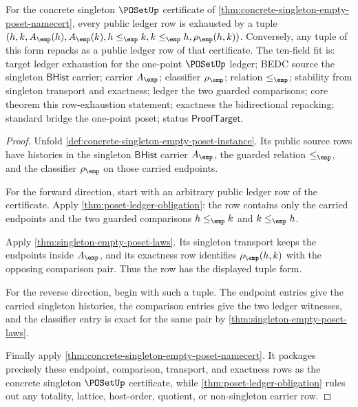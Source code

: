 \begin{theorem}
\label{thm:poset-prefix-ledger-row-exhaustion}
For the concrete singleton $\POSetUp$ certificate of
\autoref{thm:concrete-singleton-empty-poset-namecert}, every public ledger row
is exhausted by a tuple
$(h,k,A_{\emp}(h),A_{\emp}(k),h\le_{\emp}k,k\le_{\emp}h,\rho_{\emp}(h,k))$.
Conversely, any tuple of this form repacks as a public ledger row of that
certificate. The ten-field fit is: target ledger exhaustion for the one-point
$\POSetUp$ ledger; BEDC source the singleton $\mathsf{BHist}$ carrier; carrier
$A_{\emp}$; classifier $\rho_{\emp}$; relation $\le_{\emp}$; stability from
singleton transport and exactness; ledger the two guarded comparisons; core
theorem this row-exhaustion statement; exactness the bidirectional repacking;
standard bridge the one-point poset; status $\mathsf{ProofTarget}$.
\end{theorem}
\begin{proof}
Unfold \autoref{def:concrete-singleton-empty-poset-instance}. Its public
source rows have histories in the singleton $\mathsf{BHist}$ carrier
$A_{\emp}$, the guarded relation $\le_{\emp}$, and the classifier
$\rho_{\emp}$ on those carried endpoints.

For the forward direction, start with an arbitrary public ledger row of the
certificate. Apply \autoref{thm:poset-ledger-obligation}: the row contains only
the carried endpoints and the two guarded comparisons
$h\le_{\emp}k$ and $k\le_{\emp}h$.

Apply \autoref{thm:singleton-empty-poset-laws}. Its singleton transport keeps
the endpoints inside $A_{\emp}$, and its exactness row identifies
$\rho_{\emp}(h,k)$ with the opposing comparison pair. Thus the row has the
displayed tuple form.

For the reverse direction, begin with such a tuple. The endpoint entries give
the carried singleton histories, the comparison entries give the two ledger
witnesses, and the classifier entry is exact for the same pair by
\autoref{thm:singleton-empty-poset-laws}.

Finally apply \autoref{thm:concrete-singleton-empty-poset-namecert}. It
packages precisely these endpoint, comparison, transport, and exactness rows
as the concrete singleton $\POSetUp$ certificate, while
\autoref{thm:poset-ledger-obligation} rules out any totality, lattice,
host-order, quotient, or non-singleton carrier row.
\end{proof}

